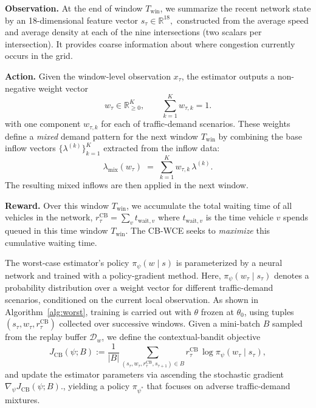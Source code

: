 \documentclass{ifacconf}
\newcommand{\1}{\mbox{1}\hspace{-0.25em}\mbox{l}}
\begin{document}
\textbf{Observation.}
At the end of window $T_{\mathrm{win}}$, we summarize the recent network state by an 18-dimensional feature vector
\(
s_\tau \in \mathbb{R}^{18},
\)
constructed from the average speed and average density at each of the nine intersections (two scalars per intersection). It provides coarse information about where congestion currently occurs in the grid.

\textbf{Action.}
Given the window-level observation $x_\tau$, the estimator outputs a non-negative weight vector
\[
w_\tau \in \mathbb{R}_{\ge 0}^K, \qquad \sum_{k=1}^K w_{\tau,k} = 1.
\]
with one component $w_{\tau,k}$ for each of traffic-demand scenarios. These weights define a \emph{mixed} demand pattern for the next window $T_{\mathrm{win}}$ by combining the base inflow vectors $\{\lambda^{(k)}\}_{k=1}^K$ extracted from the inflow data:
\[
\lambda_{\mathrm{mix}}(w_\tau) \;=\; \sum_{k=1}^K w_{\tau,k} \,\lambda^{(k)}.
\]
The resulting mixed inflows are then applied in the next window.

\textbf{Reward.}
Over this window $T_{\mathrm{win}}$, we accumulate the total waiting time of all vehicles in the network,
\(
r_\tau^{\text{CB}} = \sum_{v} t_{\text{wait}, v}
\)
where $t_{\text{wait}, v}$ is the time vehicle $v$ spends queued in this time window $T_{\mathrm{win}}$. The CB-WCE seeks to \emph{maximize} this cumulative waiting time.

The worst-case estimator’s policy $\pi_\psi(w \mid s)$ is parameterized by a neural network and trained with a policy-gradient method. 
Here, $\pi_\psi(w_\tau \mid s_\tau)$ denotes a probability distribution over a weight vector for different traffic-demand scenarios, conditioned on the current local observation. As shown in Algorithm~\ref{alg:worst}, training is carried out with $\theta$ frozen at $\theta_0$, using tuples $(s_\tau,w_\tau,r_\tau^{\mathrm{CB}})$ collected over successive windows. Given a mini-batch 
$B$ 
sampled from the replay buffer $\mathcal{D}_w$, we define the contextual-bandit objective
\begin{equation}
    J_{\mathrm{CB}}(\psi; B)
    :=
    \frac{1}{|B|}
    \sum_{(s_\tau, w_\tau, r_\tau^{\mathrm{CB}}, s_{\tau+1}) \in B}
    r_\tau^{\mathrm{CB}} \,\log \pi_\psi(w_\tau \mid s_\tau),
\end{equation}
and update the estimator parameters via ascending the stochastic gradient 
$\nabla_\psi J_{\mathrm{CB}}(\psi; B)$., yielding a policy $\pi_{\psi^\ast}$ that focuses on adverse traffic-demand mixtures. 
\end{document}
